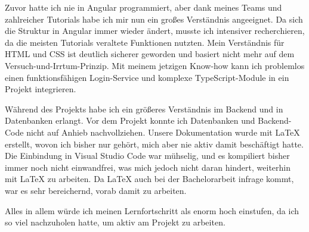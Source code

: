 Zuvor hatte ich nie in Angular programmiert, aber dank meines Teams und zahlreicher Tutorials habe ich mir nun ein großes Verständnis angeeignet. 
Da sich die Struktur in Angular immer wieder ändert, musste ich intensiver recherchieren, da die meisten Tutorials veraltete Funktionen nutzten. 
Mein Verständnis für HTML und CSS ist deutlich sicherer geworden und basiert nicht mehr auf dem Versuch-und-Irrtum-Prinzip. 
Mit meinem jetzigen Know-how kann ich problemlos einen funktionsfähigen Login-Service und komplexe \gls{TypeScript}-Module in ein Projekt integrieren.

Während des Projekts habe ich ein größeres Verständnis im Backend und in Datenbanken erlangt. 
Vor dem Projekt konnte ich Datenbanken und Backend-Code nicht auf Anhieb nachvollziehen. 
Unsere Dokumentation wurde mit LaTeX erstellt, wovon ich bisher nur gehört, mich aber nie aktiv damit beschäftigt hatte. 
Die Einbindung in Visual Studio Code war mühselig, und es kompiliert bisher immer noch nicht einwandfrei, was mich jedoch nicht daran hindert, weiterhin mit LaTeX zu arbeiten. 
Da LaTeX auch bei der Bachelorarbeit infrage kommt, war es sehr bereichernd, vorab damit zu arbeiten.

Alles in allem würde ich meinen Lernfortschritt als enorm hoch einstufen, da ich so viel nachzuholen hatte, um aktiv am Projekt zu arbeiten.

